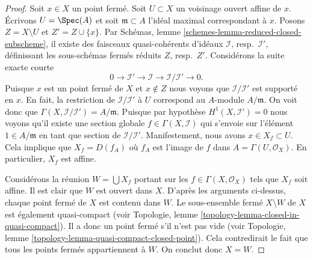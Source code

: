 \begin{proof}
Soit $x \in X$ un point fermé. Soit $U \subset X$ un voisinage ouvert
affine de $x$. Écrivons $U = \Spec(A)$ et soit
$\mathfrak m \subset A$ l'idéal maximal correspondant à $x$.
Posons $Z = X \setminus U$ et $Z' = Z \cup \{x\}$.
Par Schémas, lemme \ref{schemes-lemma-reduced-closed-subscheme},
il existe des faisceaux quasi-cohérents d'idéaux
$\mathcal{I}$, resp.\ $\mathcal{I}'$, définissant
les sous-schémas fermés réduits $Z$, resp.\ $Z'$.
Considérons la suite exacte courte
$$
0 \to \mathcal{I}' \to \mathcal{I} \to \mathcal{I}/\mathcal{I}' \to 0.
$$
Puisque $x$ est un point fermé de $X$ et $x \not \in Z$ nous voyons que
$\mathcal{I}/\mathcal{I}'$ est supporté en $x$. En fait, la restriction
de $\mathcal{I}/\mathcal{I'}$ à $U$ correspond au $A$-module
$A/\mathfrak m$. On voit donc que $\Gamma(X, \mathcal{I}/\mathcal{I'})
= A/\mathfrak m$. Puisque par hypothèse $H^1(X, \mathcal{I}') = 0$
nous voyons qu'il existe une section globale $f \in \Gamma(X, \mathcal{I})$
qui s'envoie sur l'élément $1 \in A/\mathfrak m$ en tant que section de
$\mathcal{I}/\mathcal{I'}$. Manifestement, nous avons
$x \in X_f \subset U$. Cela implique que $X_f = D(f_A)$ où
$f_A$ est l'image de $f$ dans $A = \Gamma(U, \mathcal{O}_X)$.
En particulier, $X_f$ est affine.

\medskip\noindent
Considérons la réunion $W = \bigcup X_f$ portant sur les $f \in \Gamma(X, \mathcal{O}_X)$
tels que $X_f$ soit affine. Il est clair que $W$ est ouvert dans $X$.
D'après les arguments ci-dessus, chaque point fermé de
$X$ est contenu dans $W$. Le sous-ensemble fermé $X \setminus W$ de $X$
est également quasi-compact
(voir Topologie, lemme \ref{topology-lemma-closed-in-quasi-compact}).
Il a donc un point fermé s'il n'est pas vide (voir
Topologie, lemme \ref{topology-lemma-quasi-compact-closed-point}).
Cela contredirait le fait que tous les points fermés appartiennent à
$W$. On conclut donc $X = W$.


\end{proof}
